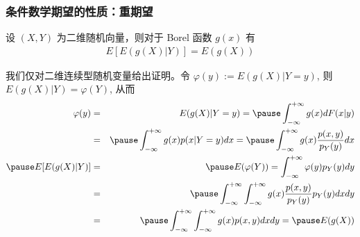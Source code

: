 \begin{frame}
	\frametitle{条件数学期望的性质：重期望}
	\begin{thm}
		设 $(X,Y)$ 为二维随机向量，则对于 Borel 函数 $g (x)$ 有
		\begin{eqnarray*}
			E[E(g(X)|Y)]=E(g(X))
		\end{eqnarray*}
	\end{thm}
	\pause \zheng 我们仅对二维连续型随机变量给出证明。令 $\varphi (y):=E (g (X)|Y=y)$, 则 $E (g (X)|Y)=\varphi (Y)$, 从而
	\begin{eqnarray*}
		\varphi(y)&=&E(g(X)|Y=y)=\pause \int_{-\infty}^{+\infty}g(x)dF(x|y)\\
		&=&\pause \int_{-\infty}^{+\infty}g(x)p(x|Y=y)dx=\pause \int_{-\infty}^{+\infty}g(x)\dfrac{p(x,y)}{p_Y(y)}dx\\
		\pause  E[E(g(X)|Y)]&=&\pause E(\varphi(Y))=\int_{-\infty}^{+\infty}\varphi(y)p_Y(y)dy\\
		&=&\pause \int_{-\infty}^{+\infty}\int_{-\infty}^{+\infty}g(x)\dfrac{p(x,y)}{p_Y(y)}p_Y(y)dxdy\\
		&=&\pause \int_{-\infty}^{+\infty}\int_{-\infty}^{+\infty}g(x)p(x,y)dxdy=\pause E(g(X))
	\end{eqnarray*}


\end{frame}

